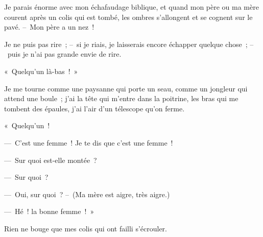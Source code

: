 \documentclass[french,twoside]{book} %
\newcommand{\astertri}{\medskip\par\centerline{\color{rubric}\large\selectfont{\syms ✻\,✻\,✻}}\medskip\par}%
\begin{document}
Je parais énorme avec mon échafaudage biblique, et quand mon père ou ma mère courent après un colis qui est tombé, les ombres s’allongent et se cognent sur le pavé. – Mon père a un nez !\par
Je ne puis pas rire ; – si je riais, je laisserais encore échapper quelque chose ; – puis je n’ai pas grande envie de rire.\par
\bigbreak
\noindent « Quelqu’un là-bas ! »\par
\bigbreak
\noindent Je me tourne comme une paysanne qui porte un seau, comme un jongleur qui attend une boule ; j’ai la tête qui m’entre dans la poitrine, les bras qui me tombent des épaules, j’ai l’air d’un télescope qu’on ferme.\par
« Quelqu’un !\par
— C’est une femme ! Je te dis que c’est une femme !\par
— Sur quoi est-elle montée ?\par
— Sur quoi ?\par
— Oui, sur quoi ? – (Ma mère est aigre, très aigre.)\par
— Hé ! la bonne femme ! »\par
Rien ne bouge que mes colis qui ont failli s’écrouler.\par

\astertri
\end{document}
